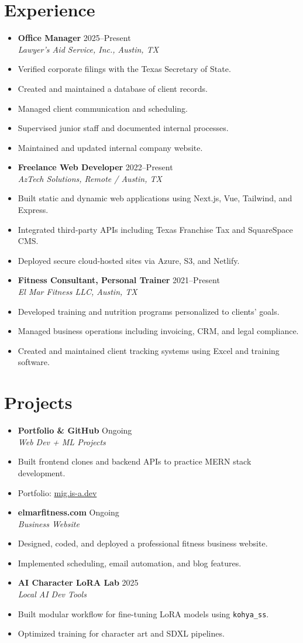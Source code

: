 \documentclass[letterpaper,10pt]{article}
\newcommand{\resumeItem}[1]{\item\small{#1}}
\newcommand{\resumeSubheading}[4]{
  \vspace{-1pt}\item
    \textbf{#1} \hfill #2 \\
    \textit{\small#3} \hfill \textit{\small #4}
}
\begin{document}
\section*{Experience}
\begin{itemize}[leftmargin=0.15in]
  \resumeSubheading
    {Office Manager}{2025–Present}
    {Lawyer's Aid Service, Inc., Austin, TX}{}
    \resumeItem{Verified corporate filings with the Texas Secretary of State.}
    \resumeItem{Created and maintained a database of client records.}
    \resumeItem{Managed client communication and scheduling.}
    \resumeItem{Supervised junior staff and documented internal processes.}
    \resumeItem{Maintained and updated internal company website.}

  \resumeSubheading
    {Freelance Web Developer}{2022–Present}
    {AzTech Solutions, Remote / Austin, TX}{}
    \resumeItem{Built static and dynamic web applications using Next.js, Vue, Tailwind, and Express.}
    \resumeItem{Integrated third-party APIs including Texas Franchise Tax and SquareSpace CMS.}
    \resumeItem{Deployed secure cloud-hosted sites via Azure, S3, and Netlify.}

  \resumeSubheading
    {Fitness Consultant, Personal Trainer}{2021–Present}
    {El Mar Fitness LLC, Austin, TX}{}
    \resumeItem{Developed training and nutrition programs personalized to clients' goals.}
    \resumeItem{Managed business operations including invoicing, CRM, and legal compliance.}
    \resumeItem{Created and maintained client tracking systems using Excel and training software.}

\end{itemize}

\section*{Projects}
\begin{itemize}[leftmargin=0.15in]
  \resumeSubheading
    {Portfolio \& GitHub}{Ongoing}
    {Web Dev + ML Projects}{}
    \resumeItem{Built frontend clones and backend APIs to practice MERN stack development.}
    \resumeItem{Portfolio: \href{https://mig.is-a.dev}{mig.is-a.dev}}

  \resumeSubheading
    {elmarfitness.com}{Ongoing}
    {Business Website}{}
    \resumeItem{Designed, coded, and deployed a professional fitness business website.}
    \resumeItem{Implemented scheduling, email automation, and blog features.}
    
  \resumeSubheading
    {AI Character LoRA Lab}{2025}
    {Local AI Dev Tools}{}
    \resumeItem{Built modular workflow for fine-tuning LoRA models using \texttt{kohya\_ss}.}
    \resumeItem{Optimized training for character art and SDXL pipelines.}
\end{itemize}
\end{document}
